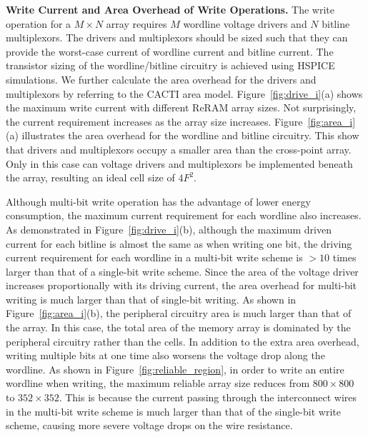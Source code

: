 \vspace{5pt}\noindent\textbf{Write Current and Area Overhead of Write Operations.}
%
The write operation for a $M \times N$ array requires $M$ wordline voltage
drivers and $N$ bitline multiplexors. The drivers and multiplexors should
be sized such that they can provide the worst-case current of wordline
current and bitline current. The transistor sizing of the wordline/bitline
circuitry is achieved using HSPICE simulations. We further calculate the
area overhead for the drivers and multiplexors by referring to the CACTI
area model. Figure~\ref{fig:drive_i}(a) shows the maximum write current
with different ReRAM array sizes. Not surprisingly, the current
requirement increases as the array size increases.
Figure~\ref{fig:area_i}(a) illustrates the area overhead for the wordline
and bitline circuitry. This show that drivers and multiplexors occupy a
smaller area than the cross-point array. Only in this case can voltage
drivers and multiplexors be implemented beneath the array, resulting an
ideal cell size of $4F^2$.

Although multi-bit write operation has the advantage of lower energy
consumption, the maximum current requirement for each wordline also
increases. As demonstrated in Figure~\ref{fig:drive_i}(b), although the
maximum driven current for each bitline is almost the same as when writing
one bit, the driving current requirement for each wordline in a multi-bit
write scheme is $>10$ times larger than that of a single-bit write scheme.
Since the area of the voltage driver increases proportionally with its
driving current, the area overhead for multi-bit writing is much larger
than that of single-bit writing. As shown in Figure~\ref{fig:area_i}(b),
the peripheral circuitry area is much larger than that of the array. In
this case, the total area of the memory array is dominated by the
peripheral circuitry rather than the cells. In addition to the extra area
overhead, writing multiple bits at one time also worsens the voltage drop
along the wordline. As shown in Figure~\ref{fig:reliable_region}, in order
to write an entire wordline when writing, the maximum reliable array size
reduces from $800 \times 800$ to $352 \times 352$. This is because the
current passing through the interconnect wires in the multi-bit write
scheme is much larger than that of the single-bit write scheme, causing
more severe voltage drops on the wire resistance.

